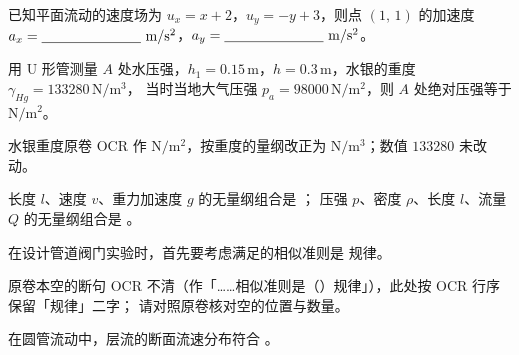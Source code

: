 \begin{ti}
  \item 已知平面流动的速度场为 $u_x=x+2$，$u_y=-y+3$，则点 $(1,\,1)$ 的加速度
  $a_x=\underline{\hspace{2.5cm}}\ \mathrm{m/s^2}$，$a_y=\underline{\hspace{2.5cm}}\ \mathrm{m/s^2}$。\hfill{}

  \item 用 U 形管测量 $A$ 处水压强，$h_1=0.15\,\mathrm{m}$，$h=0.3\,\mathrm{m}$，水银的重度 $\gamma_{Hg}=133280\,\mathrm{N/m^3}$，
  当时当地大气压强 $p_a=98000\,\mathrm{N/m^2}$，则 $A$ 处绝对压强等于 \underline{\hspace{2.5cm}} $\mathrm{N/m^2}$。\hfill{}
  \begin{tishi}水银重度原卷 OCR 作 $\mathrm{N/m^2}$，按重度的量纲改正为 $\mathrm{N/m^3}$；数值 $133280$ 未改动。\end{tishi}

  \item 长度 $l$、速度 $v$、重力加速度 $g$ 的无量纲组合是 \underline{\hspace{3cm}}；
  压强 $p$、密度 $\rho$、长度 $l$、流量 $Q$ 的无量纲组合是 \underline{\hspace{3cm}}。\hfill{}

  \item 在设计管道阀门实验时，首先要考虑满足的相似准则是 \underline{\hspace{2.5cm}} 规律。\hfill{}
  \begin{tishi}原卷本空的断句 OCR 不清（作「……相似准则是（\quad）规律」），此处按 OCR 行序保留「规律」二字；
  请对照原卷核对空的位置与数量。\end{tishi}

  \item 在圆管流动中，层流的断面流速分布符合 \underline{\hspace{2.5cm}}。\hfill{}


\end{ti}
